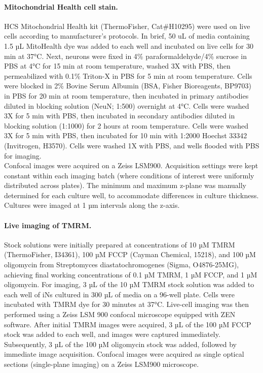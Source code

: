 \paragraph{Mitochondrial Health cell stain.}
HCS Mitochondrial Health kit (ThermoFisher, Cat\#H10295) were used on live cells according to manufacturer’s protocols. In brief, 50 uL of media containing 1.5 µL MitoHealth dye was added to each well and incubated on live cells for 30 min at 37°C. Next, neurons were fixed in 4\% paraformaldehyde/4\% sucrose in PBS at 4°C for 15 min at room temperature, washed 3X with PBS, then permeabilized with 0.1\% Triton-X in PBS for 5 min at room temperature. Cells were blocked in 2\% Bovine Serum Albumin (BSA, Fisher Bioreagents, BP9703) in PBS for 20 min at room temperature, then incubated in primary antibodies diluted in blocking solution (NeuN; 1:500) overnight at 4°C. Cells were washed 3X for 5 min with PBS, then incubated in secondary antibodies diluted in blocking solution (1:1000) for 2 hours at room temperature. Cells were washed 3X for 5 min with PBS, then incubated for 10 min with 1:2000 Hoechst 33342 (Invitrogen, H3570). Cells were washed 1X with PBS, and wells flooded with PBS for imaging.\\
Confocal images were acquired on a Zeiss LSM900. Acquisition settings were kept constant within each imaging batch (where conditions of interest were uniformly distributed across plates). The minimum and maximum z-plane was manually determined for each culture well, to accommodate differences in culture thickness. Cultures were imaged at 1 µm intervals along the z-axis.

\paragraph{Live imaging of TMRM.}
Stock solutions were initially prepared at concentrations of 10 µM TMRM (ThermoFisher, I34361), 100 µM FCCP (Cayman Chemical, 15218), and 100 µM oligomycin from Streptomyces diastatochromogenes (Sigma, O4876-25MG), achieving final working concentrations of 0.1 µM TMRM, 1 µM FCCP, and 1 µM oligomycin. For imaging, 3 µL of the 10 µM TMRM stock solution was added to each well of iNs cultured in 300 µL of media on a 96-well plate. Cells were incubated with TMRM dye for 30 minutes at 37°C. Live-cell imaging was then performed using a Zeiss LSM 900 confocal microscope equipped with ZEN software. After initial TMRM images were acquired, 3 µL of the 100 µM FCCP stock was added to each well, and images were captured immediately. Subsequently, 3 µL of the 100 µM oligomycin stock was added, followed by immediate image acquisition. Confocal images were acquired as single optical sections (single-plane imaging) on a Zeiss LSM900 microscope.

